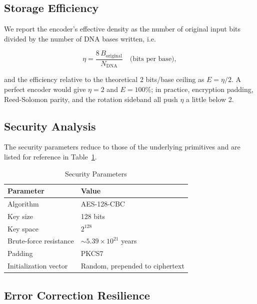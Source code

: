 \documentclass[conference]{IEEEtran}
\begin{document}
\subsection{Storage Efficiency}

We report the encoder's effective density as the number of original input bits divided by the number of DNA bases written, i.e.\

\begin{equation}
\eta = \frac{8 \, B_{\text{original}}}{N_{\text{DNA}}} \quad \text{(bits per base)},
\label{eq:density}
\end{equation}

\noindent and the efficiency relative to the theoretical 2 bits/base ceiling as $E = \eta / 2$. A perfect encoder would give $\eta = 2$ and $E = 100\%$; in practice, encryption padding, Reed-Solomon parity, and the rotation sideband all push $\eta$ a little below 2.

\subsection{Security Analysis}

The security parameters reduce to those of the underlying primitives and are listed for reference in Table~\ref{tab:security}.

\begin{table}[htbp]
\caption{Security Parameters}
\begin{center}
\begin{tabular}{|l|l|}
\hline
\textbf{Parameter} & \textbf{Value} \\
\hline
Algorithm & AES-128-CBC \\
\hline
Key size & 128 bits \\
\hline
Key space & $2^{128}$ \\
\hline
Brute-force resistance & $\sim5.39 \times 10^{21}$ years \\
\hline
Padding & PKCS7 \\
\hline
Initialization vector & Random, prepended to ciphertext \\
\hline
\end{tabular}
\label{tab:security}
\end{center}
\end{table}

\subsection{Error Correction Resilience}
\end{document}
